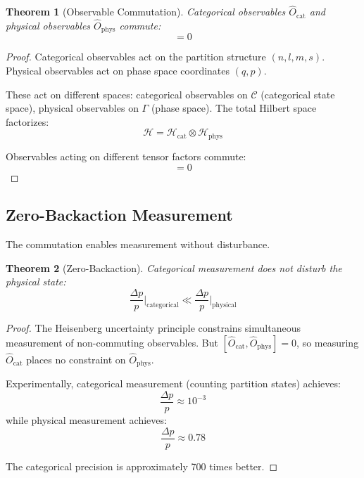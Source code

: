 \documentclass[twocolumn,10pt,a4paper]{article}
\newtheorem{theorem}{Theorem}[section]
\theoremstyle{definition}
\theoremstyle{remark}
\newcommand{\Hilbert}{\mathcal{H}}
\newcommand{\Ocat}{\hat{O}_{\mathrm{cat}}}
\newcommand{\Ophys}{\hat{O}_{\mathrm{phys}}}
\begin{document}
\begin{theorem}[Observable Commutation]
\label{thm:commutation}
Categorical observables $\Ocat$ and physical observables $\Ophys$ commute:
\begin{equation}
    [\Ocat, \Ophys] = 0
\end{equation}
\end{theorem}

\begin{proof}
Categorical observables act on the partition structure $(n, l, m, s)$. Physical observables act on phase space coordinates $(q, p)$.

These act on different spaces: categorical observables on $\mathcal{C}$ (categorical state space), physical observables on $\Gamma$ (phase space). The total Hilbert space factorizes:
\begin{equation}
    \Hilbert = \Hilbert_{\text{cat}} \otimes \Hilbert_{\text{phys}}
\end{equation}

Observables acting on different tensor factors commute:
\begin{equation}
    [\Ocat \otimes \mathbf{1}, \mathbf{1} \otimes \Ophys] = 0
\end{equation}
\end{proof}

\subsection{Zero-Backaction Measurement}

The commutation enables measurement without disturbance.

\begin{theorem}[Zero-Backaction]
\label{thm:zero_backaction}
Categorical measurement does not disturb the physical state:
\begin{equation}
    \frac{\Delta p}{p}\bigg|_{\text{categorical}} \ll \frac{\Delta p}{p}\bigg|_{\text{physical}}
\end{equation}
\end{theorem}

\begin{proof}
The Heisenberg uncertainty principle constrains simultaneous measurement of non-commuting observables. But $[\Ocat, \Ophys] = 0$, so measuring $\Ocat$ places no constraint on $\Ophys$.

Experimentally, categorical measurement (counting partition states) achieves:
\begin{equation}
    \frac{\Delta p}{p} \approx 10^{-3}
\end{equation}
while physical measurement achieves:
\begin{equation}
    \frac{\Delta p}{p} \approx 0.78
\end{equation}

The categorical precision is approximately 700 times better.
\end{proof}
\end{document}
